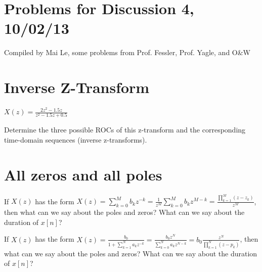 \documentclass[11pt]{article}
\begin{document}
{\small
\section*{Problems for Discussion 4, 10/02/13}
Compiled by Mai Le, some problems from Prof. Fessler, Prof. Yagle, and O\&W
}
\section{Inverse Z-Transform}
$X(z) = \frac{2z^2-1.5z}{z^2-1.5z+0.5}$

Determine the three possible ROCs of this z-transform and the corresponding time-domain sequences (inverse z-transforms).

%
%
%
%
%

\section{All zeros and all poles}

If $X(z)$ has the form $X(z)=\sum\limits_{k=0}^M b_k z^{-k}=\frac{1}{z^M}\sum\limits_{k=0}^M b_kz^{M-k}=\frac{\prod_{k=1}^M (z-z_k)}{z^M}$, then what can we say about the poles and zeros? What can we say about the duration of $x[n]$?

%
%
%
If $X(z)$ has the form $X(z)=\frac{b_0}{1+\sum\limits_{k=1}^N a_k z^{-k}}=\frac{b_0 z^N}{\sum\limits_{k=0}^N a_k z^{N-k}} = b_0 \frac{z^N}{\prod_{k=1}^N (z-p_k)}$, then what can we say about the poles and zeros? What can we say about the duration of $x[n]$?
\end{document}

